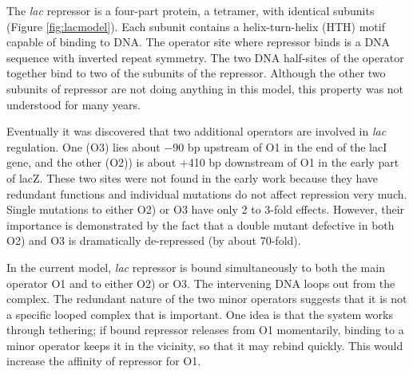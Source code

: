 The \emph{lac} repressor is a four-part protein, a tetramer, with identical subunits (Figure \ref{fig:lacmodel}). Each subunit contains a helix-turn-helix (HTH) motif capable of binding to DNA. The operator site where repressor binds is a DNA sequence with inverted repeat symmetry. The two DNA half-sites of the operator together bind to two of the subunits of the repressor. Although the other two subunits of repressor are not doing anything in this model, this property was not understood for many years.

Eventually it was discovered that two additional operators are involved in \emph{lac} regulation. One (O3) lies about −90 bp upstream of O1 in the end of the lacI gene, and the other (O2)) is about +410 bp downstream of O1 in the early part of lacZ. These two sites were not found in the early work because they have redundant functions and individual mutations do not affect repression very much. Single mutations to either O2) or O3 have only 2 to 3-fold effects. However, their importance is demonstrated by the fact that a double mutant defective in both O2) and O3 is dramatically de-repressed (by about 70-fold).

In the current model, \emph{lac} repressor is bound simultaneously to both the main operator O1 and to either O2) or O3. The intervening DNA loops out from the complex. The redundant nature of the two minor operators suggests that it is not a specific looped complex that is important. One idea is that the system works through tethering; if bound repressor releases from O1 momentarily, binding to a minor operator keeps it in the vicinity, so that it may rebind quickly. This would increase the affinity of repressor for O1.



